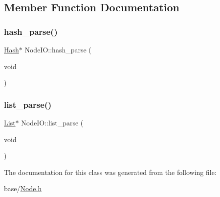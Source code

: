 \subsection{Member Function Documentation}
\mbox{\label{classNodeIO_a98fbf4c66109a6ec3e89f98855fa8c5b}} 
\subsubsection{\texorpdfstring{hash\+\_\+parse()}{hash\_parse()}}
{\footnotesize\ttfamily \mbox{\hyperlink{classHash}{Hash}}$\ast$ Node\+I\+O\+::hash\+\_\+parse (\begin{DoxyParamCaption}\item[{void}]{ }\end{DoxyParamCaption})}

\mbox{\label{classNodeIO_a03d8bdbc6fcb5a11538fdda2a6ae751d}} 
\subsubsection{\texorpdfstring{list\+\_\+parse()}{list\_parse()}}
{\footnotesize\ttfamily \mbox{\hyperlink{classList}{List}}$\ast$ Node\+I\+O\+::list\+\_\+parse (\begin{DoxyParamCaption}\item[{void}]{ }\end{DoxyParamCaption})}



The documentation for this class was generated from the following file\+:\begin{DoxyCompactItemize}
\item 
base/\mbox{\hyperlink{Node_8h}{Node.\+h}}\end{DoxyCompactItemize}
